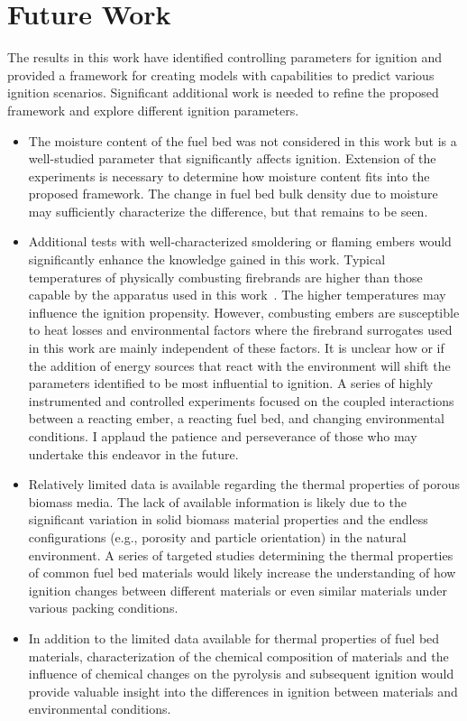 
\chapter{Future Work}
\label{chap:futureWork}

  The results in this work have identified controlling parameters for ignition and provided a framework for creating models with capabilities to predict various ignition scenarios. Significant additional work is needed to refine the proposed framework and explore different ignition parameters. 
        \begin{itemize}
            \item The moisture content of the fuel bed was not considered in this work but is a well-studied parameter that significantly affects ignition. Extension of the experiments is necessary to determine how moisture content fits into the proposed framework. The change in fuel bed bulk density due to moisture may sufficiently characterize the difference, but that remains to be seen.
            
            \item Additional tests with well-characterized smoldering or flaming embers would significantly enhance the knowledge gained in this work. Typical temperatures of physically combusting firebrands are higher than those capable by the apparatus used in this work~\cite{Fateev2017a}. The higher temperatures may influence the ignition propensity. However, combusting embers are susceptible to heat losses and environmental factors where the firebrand surrogates used in this work are mainly independent of these factors. It is unclear how or if the addition of energy sources that react with the environment will shift the parameters identified to be most influential to ignition. A series of highly instrumented and controlled experiments focused on the coupled interactions between a reacting ember, a reacting fuel bed, and changing environmental conditions. I applaud the patience and perseverance of those who may undertake this endeavor in the future. 
            
            \item Relatively limited data is available regarding the thermal properties of porous biomass media. The lack of available information is likely due to the significant variation in solid biomass material properties and the endless configurations (e.g., porosity and particle orientation) in the natural environment. A series of targeted studies determining the thermal properties of common fuel bed materials would likely increase the understanding of how ignition changes between different materials or even similar materials under various packing conditions.
            
            \item In addition to the limited data available for thermal properties of fuel bed materials, characterization of the chemical composition of materials and the influence of chemical changes on the pyrolysis and subsequent ignition would provide valuable insight into the differences in ignition between materials and environmental conditions. 
        \end{itemize}